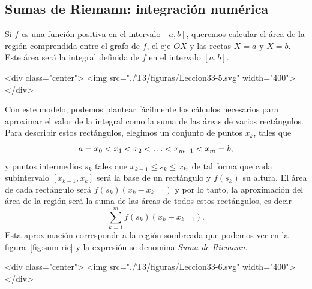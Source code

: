\subsection{Sumas de Riemann: integración numérica}

Si $f$ es una función positiva en el intervalo $[a,b]$, queremos calcular el área de la región comprendida entre el grafo de $f$, el eje $OX$ y las rectas $X=a$ y $X=b$.
Este área será la integral definida de $f$ en el intervalo $[a,b]$.
%
\begin{latexonly}
\begin{center}
\end{center}
\end{latexonly}
\begin{rawhtml}
<div class="center">
<img src="./T3/figuras/Leccion33-5.svg" width="400">
</div>
\end{rawhtml}
%
Con este modelo, podemos plantear fácilmente los cálculos necesarios para aproximar el valor de la integral como la suma de las áreas de varios rectángulos.
Para describir estos rectángulos, elegimos un conjunto de puntos $x_k$, tales que
\[
a=x_0 \sle x_1 \sle x_2 \sle \dots \sle x_{m-1} \sle x_m=b,
\]
y puntos intermedios $s_k$ tales que $x_{k-1}\le s_k\le x_k$, de tal forma que cada subintervalo
$[x_{k-1},x_k]$ será la base de un rectángulo y $f(s_k)$ su altura.
El área de cada rectángulo será $f(s_k)(x_k-x_{k-1})$ y por lo tanto, la aproximación del área de la región será la suma de las áreas de todos estos rectángulos, es decir
\enlargethispage{\baselineskip}
\[
\sum_{k=1}^m f(s_k)(x_k-x_{k-1}).
\]
Esta aproximación corresponde a la región sombreada que podemos ver en la figura~\ref{fig:sum-rie} y la expresión se denomina \emph{Suma de Riemann}.
\begin{rawhtml}
<div class="center">
<img src="./T3/figuras/Leccion33-6.svg" width="400">
</div>
\end{rawhtml}

